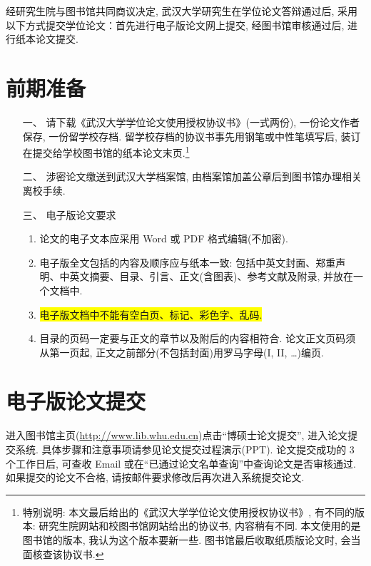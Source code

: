 \documentclass{WHUMaster}   %
\begin{document}
 \bigskip

    经研究生院与图书馆共同商议决定, 武汉大学研究生在学位论文答辩通过后,
    采用以下方式提交学位论文：首先进行电子版论文网上提交, 经图书馆审核通过后, 进行纸本论文提交.

\section*{前期准备}
\begin{itemize}
  \item[一、] 请下载《武汉大学学位论文使用授权协议书》(一式两份), 一份论文作者保存, 一份留学校存档.
    留学校存档的协议书事先用钢笔或中性笔填写后,  装订在提交给学校图书馆的纸本论文末页.\footnote{\heiti 特别说明:
    本文最后给出的《武汉大学学位论文使用授权协议书》, 有不同的版本: 研究生院网站和校图书馆网站给出的协议书, 内容稍有不同.
    本文使用的是图书馆的版本, 我认为这个版本要新一些. 图书馆最后收取纸质版论文时, 会当面核查该协议书.}

    \item[二、]涉密论文缴送到武汉大学档案馆, 由档案馆加盖公章后到图书馆办理相关离校手续.

    \item[三、]电子版论文要求
\begin{enumerate}[1.]
  \item 论文的电子文本应采用 Word 或 PDF 格式编辑(不加密).
  \item 电子版全文包括的内容及顺序应与纸本一致: 包括中英文封面、郑重声明、中英文摘要、目录、引言、正文(含图表)、参考文献及附录, 并放在一个文档中.
  \item \colorbox{yellow}{电子版文档中不能有空白页、标记、彩色字、乱码.}
  \item 目录的页码一定要与正文的章节以及附后的内容相符合. 论文正文页码须从第一页起, 正文之前部分(不包括封面)用罗马字母(I, II, \dots)编页.
\end{enumerate}
\end{itemize}



\section*{电子版论文提交}

    进入图书馆主页(\url{http://www.lib.whu.edu.cn})点击``博硕士论文提交'', 进入论文提交系统.
    具体步骤和注意事项请参见论文提交过程演示(PPT).
    论文提交成功的 3 个工作日后, 可查收 Email 或在``已通过论文名单查询''中查询论文是否审核通过.
    如果提交的论文不合格, 请按邮件要求修改后再次进入系统提交论文.
\end{document}
